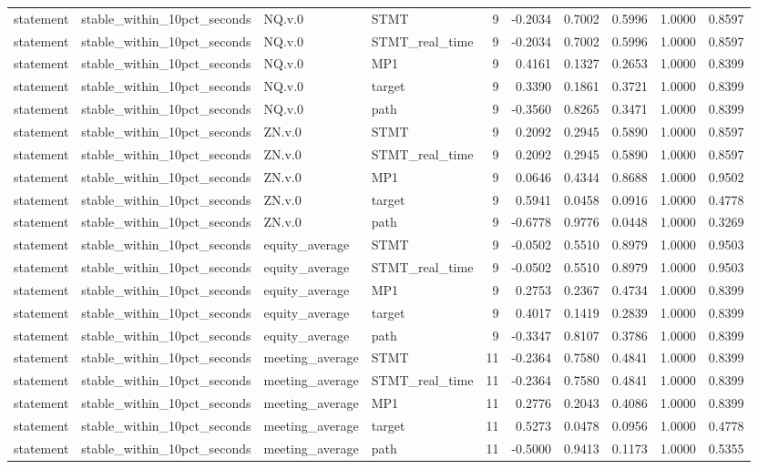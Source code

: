 \begin{tabular}{llllrrrrrr}
statement & stable_within_10pct_seconds & NQ.v.0 & STMT & 9 & -0.2034 & 0.7002 & 0.5996 & 1.0000 & 0.8597 \\
statement & stable_within_10pct_seconds & NQ.v.0 & STMT_real_time & 9 & -0.2034 & 0.7002 & 0.5996 & 1.0000 & 0.8597 \\
statement & stable_within_10pct_seconds & NQ.v.0 & MP1 & 9 & 0.4161 & 0.1327 & 0.2653 & 1.0000 & 0.8399 \\
statement & stable_within_10pct_seconds & NQ.v.0 & target & 9 & 0.3390 & 0.1861 & 0.3721 & 1.0000 & 0.8399 \\
statement & stable_within_10pct_seconds & NQ.v.0 & path & 9 & -0.3560 & 0.8265 & 0.3471 & 1.0000 & 0.8399 \\
statement & stable_within_10pct_seconds & ZN.v.0 & STMT & 9 & 0.2092 & 0.2945 & 0.5890 & 1.0000 & 0.8597 \\
statement & stable_within_10pct_seconds & ZN.v.0 & STMT_real_time & 9 & 0.2092 & 0.2945 & 0.5890 & 1.0000 & 0.8597 \\
statement & stable_within_10pct_seconds & ZN.v.0 & MP1 & 9 & 0.0646 & 0.4344 & 0.8688 & 1.0000 & 0.9502 \\
statement & stable_within_10pct_seconds & ZN.v.0 & target & 9 & 0.5941 & 0.0458 & 0.0916 & 1.0000 & 0.4778 \\
statement & stable_within_10pct_seconds & ZN.v.0 & path & 9 & -0.6778 & 0.9776 & 0.0448 & 1.0000 & 0.3269 \\
statement & stable_within_10pct_seconds & equity_average & STMT & 9 & -0.0502 & 0.5510 & 0.8979 & 1.0000 & 0.9503 \\
statement & stable_within_10pct_seconds & equity_average & STMT_real_time & 9 & -0.0502 & 0.5510 & 0.8979 & 1.0000 & 0.9503 \\
statement & stable_within_10pct_seconds & equity_average & MP1 & 9 & 0.2753 & 0.2367 & 0.4734 & 1.0000 & 0.8399 \\
statement & stable_within_10pct_seconds & equity_average & target & 9 & 0.4017 & 0.1419 & 0.2839 & 1.0000 & 0.8399 \\
statement & stable_within_10pct_seconds & equity_average & path & 9 & -0.3347 & 0.8107 & 0.3786 & 1.0000 & 0.8399 \\
statement & stable_within_10pct_seconds & meeting_average & STMT & 11 & -0.2364 & 0.7580 & 0.4841 & 1.0000 & 0.8399 \\
statement & stable_within_10pct_seconds & meeting_average & STMT_real_time & 11 & -0.2364 & 0.7580 & 0.4841 & 1.0000 & 0.8399 \\
statement & stable_within_10pct_seconds & meeting_average & MP1 & 11 & 0.2776 & 0.2043 & 0.4086 & 1.0000 & 0.8399 \\
statement & stable_within_10pct_seconds & meeting_average & target & 11 & 0.5273 & 0.0478 & 0.0956 & 1.0000 & 0.4778 \\
statement & stable_within_10pct_seconds & meeting_average & path & 11 & -0.5000 & 0.9413 & 0.1173 & 1.0000 & 0.5355 \\
\bottomrule
\end{tabular}
